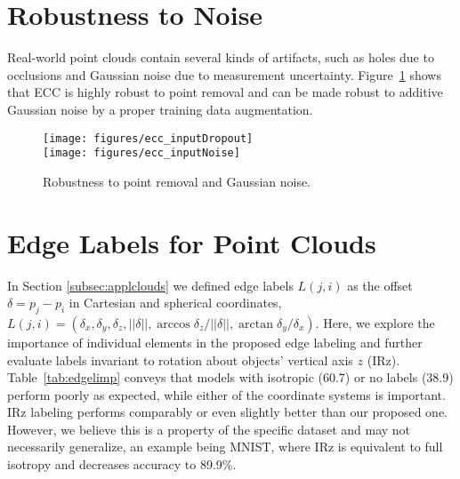 \documentclass[10pt,twocolumn,letterpaper]{article}
\begin{document}
\section{Robustness to Noise} \label{sec:pcnoise}

Real-world point clouds contain several kinds of artifacts, such as holes due to occlusions and Gaussian noise due to measurement uncertainty. Figure~\ref{fig:robutness} shows that ECC is highly robust to point removal and can be made robust to additive Gaussian noise by a proper training data augmentation.

\begin{figure}[bt]
\centering
\texttt{[image: figures/ecc\_inputDropout]} \\
\texttt{[image: figures/ecc\_inputNoise]}
\caption{\label{fig:robutness}
Robustness to point removal and Gaussian noise.}
\end{figure}



\section{Edge Labels for Point Clouds} \label{sec:pclabels}

In Section \ref{subsec:applclouds} we defined edge labels $L(j,i)$ as the offset $\delta=p_j-p_i$ in Cartesian and spherical coordinates, $L(j,i) = (\delta_x, \delta_y, \delta_z, ||\delta||, \arccos \delta_z/||\delta||, \arctan \delta_y/\delta_x)$. Here, we explore the importance of individual elements in the proposed edge labeling and further evaluate labels invariant to rotation about objects' vertical axis $z$ (IRz). Table~\ref{tab:edgelimp} conveys that models with isotropic (60.7) or no labels (38.9) perform poorly as expected, while either of the coordinate systems is important. IRz labeling performs comparably or even slightly better than our proposed one. However, we believe this is a property of the specific dataset and may not necessarily generalize, an example being MNIST, where IRz is equivalent to full isotropy and decreases accuracy to 89.9\%.


\begin{table}[bt]
\centering
{}
\vspace{1ex}
\caption{\label{tab:edgelimp}
ECC on Sydney with varied edge label definition.}
\end{table}
\end{document}
